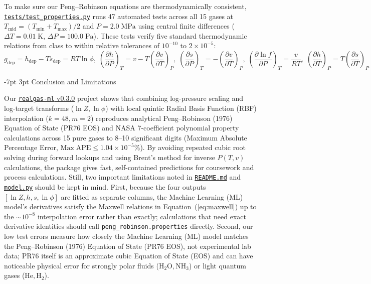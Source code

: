 \documentclass[10pt,a4paper]{article}
\makeatletter
\renewcommand\section{\@startsection {section}{1}{\z@}%
  {-7pt \@plus -2pt \@minus -1pt}%
  {3pt \@plus 1pt}%
  {\normalfont\large\bfseries\color{darkslate}}}
\makeatother
\begin{document}
To make sure our Peng--Robinson equations are thermodynamically consistent, \href{https://github.com/satwikgupta122/realgas_ml/blob/main/tests/test_properties.py}{\texttt{tests/test\_properties.py}} runs 47 automated tests across all 15 gases at $T_{\mathrm{mid}} = (T_{\min} + T_{\max})/2$ and $P = 2.0\;\mathrm{MPa}$ using central finite differences ($\Delta T = 0.01\;\mathrm{K}$, $\Delta P = 100.0\;\mathrm{Pa}$). These tests verify five standard thermodynamic relations from class to within relative tolerances of $10^{-10}$ to $2\times 10^{-5}$:
\begin{equation}
g_{\mathrm{dep}} = h_{\mathrm{dep}} - T s_{\mathrm{dep}} = RT\ln\phi, \; \left(\frac{\partial h}{\partial P}\right)_T = v - T\left(\frac{\partial v}{\partial T}\right)_P, \; \left(\frac{\partial s}{\partial P}\right)_T = -\left(\frac{\partial v}{\partial T}\right)_P, \; \left(\frac{\partial \ln f}{\partial P}\right)_T = \frac{v}{RT}, \; \left(\frac{\partial h}{\partial T}\right)_P = T\left(\frac{\partial s}{\partial T}\right)_P
\label{eq:maxwell}
\end{equation}

\section{Conclusion and Limitations}

Our \href{https://github.com/satwikgupta122/realgas_ml}{\texttt{realgas-ml} v0.3.0} project shows that combining log-pressure scaling and log-target transforms ($\ln Z, \ln\phi$) with local quintic Radial Basis Function (RBF) interpolation ($k=48, m=2$) reproduces analytical Peng--Robinson (1976) Equation of State (PR76 EOS) and NASA 7-coefficient polynomial property calculations across 15 pure gases to 8--10 significant digits (Maximum Absolute Percentage Error, $\mathrm{Max\;APE} \le 1.04\times 10^{-5}\%$). By avoiding repeated cubic root solving during forward lookups and using Brent's method for inverse $P(T,v)$ calculations, the package gives fast, self-contained predictions for coursework and process calculations. Still, two important limitations noted in \href{https://github.com/satwikgupta122/realgas_ml/blob/main/README.md}{\texttt{README.md}} and \href{https://github.com/satwikgupta122/realgas_ml/blob/main/realgas_ml/model.py}{\texttt{model.py}} should be kept in mind. First, because the four outputs $[\ln Z, h, s, \ln\phi]$ are fitted as separate columns, the Machine Learning (ML) model's derivatives satisfy the Maxwell relations in Equation~(\ref{eq:maxwell}) up to the $\sim 10^{-8}$ interpolation error rather than exactly; calculations that need exact derivative identities should call \texttt{peng\_robinson.properties} directly. Second, our low test errors measure how closely the Machine Learning (ML) model matches the Peng--Robinson (1976) Equation of State (PR76 EOS), not experimental lab data; PR76 itself is an approximate cubic Equation of State (EOS) and can have noticeable physical error for strongly polar fluids ($\mathrm{H_2O}, \mathrm{NH_3}$) or light quantum gases ($\mathrm{He}, \mathrm{H_2}$).
\end{document}
